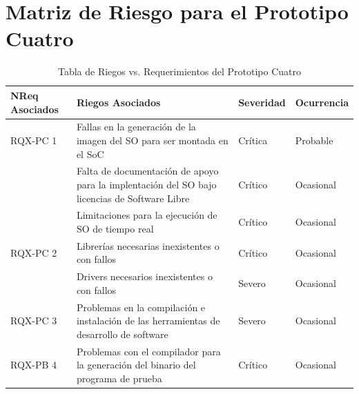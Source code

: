 		
		\section{Matriz de Riesgo para el Prototipo Cuatro} 

		\begin{table}[h!]
		\centering
		\begin{tabular}{ p{2.5cm} p{9cm} p{2cm} p{2cm} }
		\hline 
		\rowcolor[gray]{0.8} N\textordmasculine Req Asociados  & Riegos Asociados & Severidad  & Ocurrencia \\
		\hline RQX-PC 1 & Fallas en la generación de la imagen del SO para ser montada en el SoC & Crítica       & Probable \\
		\hline			& Falta de documentación de apoyo para la implentación del SO bajo licencias de Software Libre & Crítico & Ocasional\\	
		\hline			& Limitaciones para la ejecución de SO de tiempo real & Crítico & Ocasional\\	
 		\hline RQX-PC 2 & Librerías necesarias inexistentes o con fallos& Crítico & Ocasional\\	
		\hline			& Drivers necesarios inexistentes o con fallos  & Severo  &  Ocasional\\ 
		\hline RQX-PC 3	& Problemas en la compilación e instalación de las herramientas de desarrollo de software& Severo  &  Ocasional\\ 
		\hline RQX-PB 4 & Problemas con el compilador para la generación del binario del programa de prueba  & Crítico&  Ocasional\\
		\hline
		\end{tabular}
		\caption{Tabla de Riegos vs. Requerimientos del Prototipo Cuatro}
		\end{table}

		\newpage

